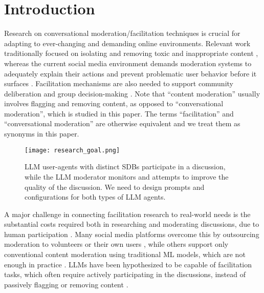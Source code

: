 %
\section{Introduction}
\label{sec:introduction}

Research on conversational moderation/facilitation techniques is crucial for adapting to ever-changing and demanding online environments. Relevant work traditionally focused on isolating and removing toxic and inappropriate content \cite{seering_self_moderation, cresci_pesonalized_interventions}, whereas the current social media environment demands moderation systems to adequately explain their actions and prevent problematic user behavior before it surfaces \cite{cho-etal-2024-language, seering_self_moderation, cresci_pesonalized_interventions, make_reddit_great}.  Facilitation mechanisms are also needed to support community deliberation and group decision-making \cite{kim_et_al_chatbot, seering_self_moderation}. Note that “content moderation” usually involves flagging and removing content, as opposed to “conversational moderation”, which is studied in this paper. The terms “facilitation” and “conversational moderation” are otherwise equivalent \cite{argyle2023, korre2025evaluation, falk-etal-2021-predicting} and we treat them as synonyms in this paper.

\begin{figure}[t]
	\centering
	\texttt{[image: research\_goal.png]}
	\caption{\ac{LLM} user-agents with distinct \acp{SDB} participate in a discussion, while the \ac{LLM} moderator monitors and attempts to improve the quality of the discussion. We need to design prompts and configurations for both types of \ac{LLM} agents.}
	\label{fig::goals}
\end{figure}

A major challenge in connecting facilitation research to real-world needs is the substantial costs required both in researching and moderating discussions, due to human participation \cite{rossi_2024}. Many social media platforms overcome this by outsourcing moderation to volunteers or their own users \cite{Matias2019TheCL, schaffner_community_guidelines}, while others support only conventional content moderation using traditional \ac{ML} models, which are not enough in practice \cite{horta_automated_moderation, schaffner_community_guidelines}. \acfp{LLM} have been hypothesized to be capable of facilitation tasks, which often require actively participating in the discussions, instead of passively flagging or removing content \cite{small-polis-llm, korre2025evaluation}. 

